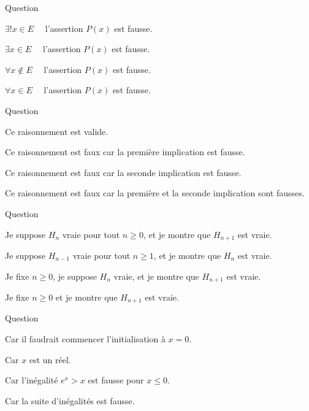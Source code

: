 \begin{multi}[multiple,feedback=
{Un contre-exemple, c'est trouver un \(x\) qui ne vérifie pas \(P(x)\). (Rien ne dit qu'il est unique.)
}]{Question}
    \item \(\exists! x \in E \quad\) l'assertion \(P(x)\) est fausse.
    \item* \(\exists x \in E \quad\) l'assertion \(P(x)\) est fausse.
    \item \(\forall x \notin E \quad\) l'assertion \(P(x)\) est fausse.
    \item \(\forall x \in E \quad\) l'assertion \(P(x)\) est fausse.
\end{multi}


\begin{multi}[multiple,feedback=
{On ne peut pas distribuer un "pour tout" avec un "ou". 
}]{Question}
    \item Ce raisonnement est valide.
    \item Ce raisonnement est faux car la première implication est fausse.
    \item* Ce raisonnement est faux car la seconde implication est fausse.
    \item Ce raisonnement est faux car la première et la seconde implication sont fausses.
\end{multi}


\begin{multi}[multiple,feedback=
{La récurrence a une rédaction très rigide. Sinon on raconte vite n'importe quoi !
}]{Question}
    \item Je suppose \(H_n\) vraie pour tout \(n\ge0\), et je montre que \(H_{n+1}\) est vraie.
    \item Je suppose \(H_{n-1}\) vraie pour tout \(n\ge1\), et je montre que \(H_{n}\) est vraie.
    \item* Je fixe \(n\ge0\), je suppose \(H_n\) vraie, et je montre que \(H_{n+1}\) est vraie.
    \item Je fixe \(n\ge0\) et je montre que \(H_{n+1}\) est vraie.
\end{multi}


\begin{multi}[multiple,feedback=
{La récurrence c'est uniquement avec des entiers !
}]{Question}
    \item Car il faudrait commencer l'initialisation à \(x=0\).
    \item* Car \(x\) est un réel.
    \item Car l'inégalité \(e^x > x\) est fausse pour \(x\le0\).
    \item Car la suite d'inégalités est fausse.
\end{multi}


